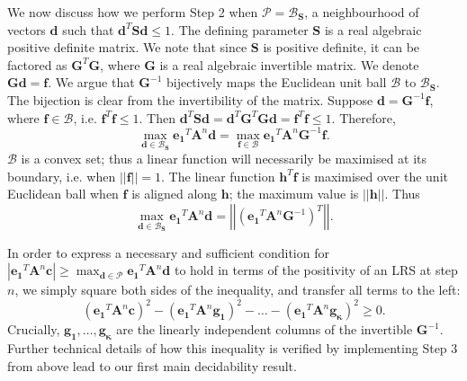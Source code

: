 We now discuss how we perform Step 2 when $\mathcal{P} = \mathcal{B}_\mathbf{S}$, a neighbourhood of vectors $\mathbf{d}$ such that $\mathbf{d}^T\mathbf{S}\mathbf{d} \le 1$. The defining parameter $\mathbf{S}$ is a real algebraic positive definite matrix. We note that since $\mathbf{S}$ is positive definite, it can be factored as $\mathbf{G}^T\mathbf{G}$, where $\mathbf{G}$ is a real algebraic invertible matrix. We denote $\mathbf{Gd} = \mathbf{f}$. We argue that $\mathbf{G}^{-1}$ bijectively maps the Euclidean unit ball $\mathcal{B}$ to $\mathcal{B}_\mathbf{S}$. The bijection is clear from the invertibility of the matrix. Suppose $\mathbf{d} = \mathbf{G}^{-1}\mathbf{f}$, where $\mathbf{f} \in \mathcal{B}$, i.e. $\mathbf{f}^T\mathbf{f} \le 1$. Then $\mathbf{d}^T\mathbf{Sd} = \mathbf{d}^T\mathbf{G}^T\mathbf{Gd} = \mathbf{f}^T\mathbf{f} \le 1.$
Therefore,
\begin{equation}
\max_{\mathbf{d} \in \mathcal{B}_\mathbf{S}} \mathbf{e_1}^T\mathbf{A}^n\mathbf{d} = \max_{\mathbf{f} \in \mathcal{B}} \mathbf{e_1}^T\mathbf{A}^n\mathbf{G}^{-1}\mathbf{f}.
\end{equation}
$\mathcal{B}$ is a convex set; thus a linear function will necessarily be maximised at its boundary, i.e. when $||\mathbf{f}|| = 1$. The linear function $\mathbf{h}^T\mathbf{f}$ is maximised over the unit Euclidean ball when $\mathbf{f}$ is aligned along $\mathbf{h}$; the maximum value is $||\mathbf{h}||$. Thus
\begin{equation}
\max_{\mathbf{d} \in \mathcal{B}_\mathbf{S}} \mathbf{e_1}^T\mathbf{A}^n\mathbf{d} = \left|\left|\left( \mathbf{e_1}^T\mathbf{A}^n\mathbf{G}^{-1} \right)^T\right|\right|.
\end{equation}

In order to express a necessary and sufficient condition for $|\mathbf{e_1}^T \mathbf{A}^n \mathbf{c}|\ge \max_{\mathbf{d} \in \mathcal{P}} \mathbf{e_1}^T\mathbf{A}^n\mathbf{d}$ to hold in terms of the positivity of an LRS at step $n$, we simply square both sides of the inequality, and transfer all terms to the left: 
\begin{equation}
(\mathbf{e_1}^T \mathbf{A}^n \mathbf{c})^2 - (\mathbf{e_1}^T \mathbf{A}^n \mathbf{g_1})^2 - \dots - (\mathbf{e_1}^T \mathbf{A}^n \mathbf{g_\kappa})^2 \ge 0.
\end{equation}
Crucially, $\mathbf{g_1}, \dots, \mathbf{g_\kappa}$ are the linearly independent columns of the invertible $\mathbf{G}^{-1}$. Further technical details of how this inequality is verified by implementing Step 3 from above lead to our first main decidability result.

